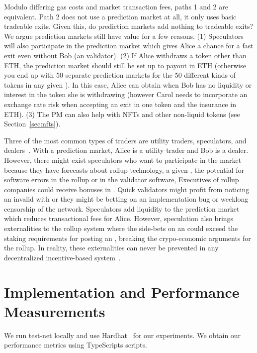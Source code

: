 Modulo differing gas costs and market transaction fees, paths 1 and 2 are equivalent. Path 2 does not use a prediction market at all, it only uses basic tradeable exits. Given this, do prediction markets add nothing to tradeable exits? We argue prediction markets still have value for a few reasons. (1) Speculators will also participate in the prediction market which gives Alice a chance for a fast exit even without Bob (an \layertwo validator). (2) If Alice withdraws a token other than ETH, the prediction market should still be set up to payout in ETH (otherwise you end up with 50 separate prediction markets for the 50 different kinds of tokens in any given \rblock). In this case, Alice can obtain \fail when Bob has no liquidity or interest in the token she is withdrawing (however Carol needs to incorporate an exchange rate risk when accepting an exit in one token and the insurance in ETH). (3) The PM can also help with NFTs and other non-liquid tokens (see Section~\ref{sec:nfts}).

Three of the most common types of traders are utility traders, speculators, and dealers~\cite{Har03}. With a prediction market, Alice is a utility trader and Bob is a dealer. However, there might exist speculators who want to participate in the market because they have forecasts about rollup technology, a given \rblock, the potential for software errors in the rollup or in the validator software, \etc Executives of rollup companies could receive bonuses in \final. Quick validators might profit from noticing an invalid \rblock with \fail or they might be betting on an implementation bug or weeklong censorship of the network. Speculators add liquidity to the prediction market which reduces transactional fees for Alice. However, speculation also brings externalities to the rollup system where the side-bets on an \rblock could exceed the staking requirements for posting an \rblock, breaking the crypo-economic arguments for the rollup. In reality, these externalities can never be prevented in any decentralized incentive-based system~\cite{FoBo19}. 

\section{Implementation and Performance Measurements} 

We run \arb \nitro test-net locally and use Hardhat~\cite{hardhatonline} for our experiments. We obtain our performance metrics using TypeScripts scripts. 

